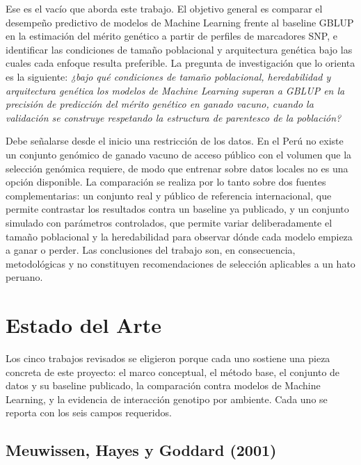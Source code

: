 \documentclass[conference]{IEEEtran}
\begin{document}
Ese es el vacío que aborda este trabajo. El objetivo general es comparar
el desempeño predictivo de modelos de Machine Learning frente al baseline
GBLUP en la estimación del mérito genético a partir de perfiles de
marcadores SNP, e identificar las condiciones de tamaño poblacional y
arquitectura genética bajo las cuales cada enfoque resulta preferible. La
pregunta de investigación que lo orienta es la siguiente: \textit{¿bajo
qué condiciones de tamaño poblacional, heredabilidad y arquitectura
genética los modelos de Machine Learning superan a GBLUP en la precisión
de predicción del mérito genético en ganado vacuno, cuando la validación
se construye respetando la estructura de parentesco de la población?}

Debe señalarse desde el inicio una restricción de los datos. En el Perú
no existe un conjunto genómico de ganado vacuno de acceso público con el
volumen que la selección genómica requiere, de modo que entrenar sobre
datos locales no es una opción disponible. La comparación se realiza por
lo tanto sobre dos fuentes complementarias: un conjunto real y público de
referencia internacional, que permite contrastar los resultados contra un
baseline ya publicado, y un conjunto simulado con parámetros controlados,
que permite variar deliberadamente el tamaño poblacional y la
heredabilidad para observar dónde cada modelo empieza a ganar o perder.
Las conclusiones del trabajo son, en consecuencia, metodológicas y no
constituyen recomendaciones de selección aplicables a un hato peruano.

\section{Estado del Arte}

Los cinco trabajos revisados se eligieron porque cada uno sostiene una
pieza concreta de este proyecto: el marco conceptual, el método base, el
conjunto de datos y su baseline publicado, la comparación contra modelos
de Machine Learning, y la evidencia de interacción genotipo por ambiente.
Cada uno se reporta con los seis campos requeridos.

\subsection{Meuwissen, Hayes y Goddard (2001)}
\end{document}
